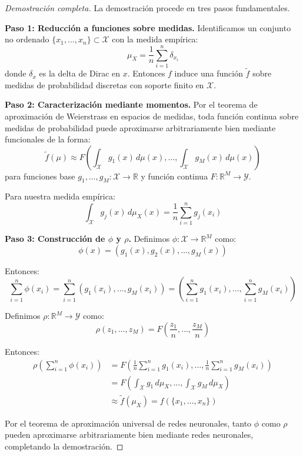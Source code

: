 \begin{proof}[Demostración completa]
La demostración procede en tres pasos fundamentales.

\textbf{Paso 1: Reducción a funciones sobre medidas.}
Identificamos un conjunto no ordenado $\{x_1, \ldots, x_n\} \subset \mathcal{X}$ con la medida empírica:
\begin{equation}
\mu_X = \frac{1}{n}\sum_{i=1}^n \delta_{x_i}
\end{equation}
donde $\delta_x$ es la delta de Dirac en $x$. Entonces $f$ induce una función $\tilde{f}$ sobre medidas de probabilidad discretas con soporte finito en $\mathcal{X}$.

\textbf{Paso 2: Caracterización mediante momentos.}
Por el teorema de aproximación de Weierstrass en espacios de medidas, toda función continua sobre medidas de probabilidad puede aproximarse arbitrariamente bien mediante funcionales de la forma:
\begin{equation}
\tilde{f}(\mu) \approx F\left(\int_\mathcal{X} g_1(x)\, d\mu(x), \ldots, \int_\mathcal{X} g_M(x)\, d\mu(x)\right)
\end{equation}
para funciones base $g_1, \ldots, g_M: \mathcal{X} \to \mathbb{R}$ y función continua $F: \mathbb{R}^M \to \mathcal{Y}$.

Para nuestra medida empírica:
\begin{equation}
\int_\mathcal{X} g_j(x)\, d\mu_X(x) = \frac{1}{n}\sum_{i=1}^n g_j(x_i)
\end{equation}

\textbf{Paso 3: Construcción de $\phi$ y $\rho$.}
Definimos $\phi: \mathcal{X} \to \mathbb{R}^M$ como:
\begin{equation}
\phi(x) = (g_1(x), g_2(x), \ldots, g_M(x))
\end{equation}

Entonces:
\begin{equation}
\sum_{i=1}^n \phi(x_i) = \sum_{i=1}^n (g_1(x_i), \ldots, g_M(x_i)) = \left(\sum_{i=1}^n g_1(x_i), \ldots, \sum_{i=1}^n g_M(x_i)\right)
\end{equation}

Definimos $\rho: \mathbb{R}^M \to \mathcal{Y}$ como:
\begin{equation}
\rho(z_1, \ldots, z_M) = F\left(\frac{z_1}{n}, \ldots, \frac{z_M}{n}\right)
\end{equation}

Entonces:
\begin{align}
\rho\left(\sum_{i=1}^n \phi(x_i)\right) &= F\left(\frac{1}{n}\sum_{i=1}^n g_1(x_i), \ldots, \frac{1}{n}\sum_{i=1}^n g_M(x_i)\right) \\
&= F\left(\int_\mathcal{X} g_1\, d\mu_X, \ldots, \int_\mathcal{X} g_M\, d\mu_X\right) \\
&\approx \tilde{f}(\mu_X) = f(\{x_1, \ldots, x_n\})
\end{align}

Por el teorema de aproximación universal de redes neuronales, tanto $\phi$ como $\rho$ pueden aproximarse arbitrariamente bien mediante redes neuronales, completando la demostración.
\end{proof}

